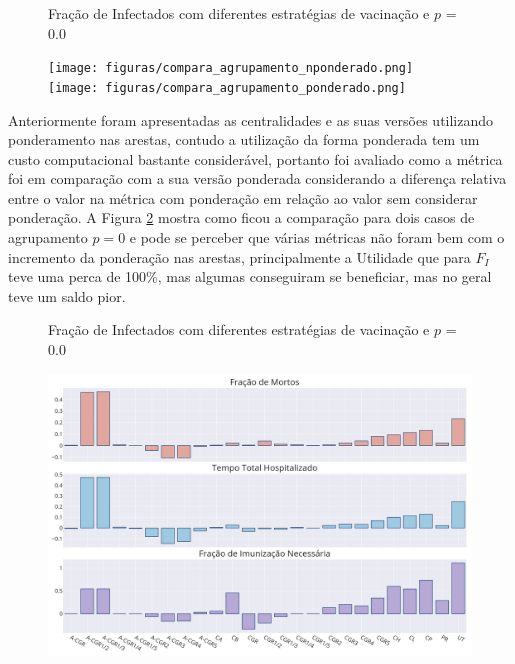 \begin{figure}[H]
    \centering
    \captionsetup{font=normalsize,skip=0.8pt,singlelinecheck=on,labelsep=endash}
    \caption{Fração de Infectados com diferentes estratégias de vacinação e $p$ = 0.0}
    
    \texttt{[image: figuras/compara\_agrupamento\_nponderado.png]}
    \\
    \texttt{[image: figuras/compara\_agrupamento\_ponderado.png]}
    \captionsetup{font=small,justification=justified}
    \caption*{}
    \label{fig:Spearman_p}
\end{figure}

Anteriormente foram apresentadas as centralidades e as suas versões utilizando ponderamento nas arestas, contudo a utilização da forma ponderada tem um custo computacional bastante considerável, portanto foi avaliado como a métrica foi em comparação com a sua versão ponderada considerando a diferença relativa entre o valor na métrica com ponderação em relação ao valor sem considerar ponderação. A Figura \ref{fig:compara_pesos} mostra como ficou a comparação para dois casos de agrupamento $p = 0$ e pode se perceber que várias métricas não foram bem com o incremento da ponderação nas arestas, principalmente a Utilidade que para $F_I$ teve uma perca de 100\%, mas algumas conseguiram se beneficiar, mas no geral teve um saldo pior.

\begin{figure}[H]
    \centering
    \captionsetup{font=normalsize,skip=0.8pt,singlelinecheck=on,labelsep=endash}
    \caption{Fração de Infectados com diferentes estratégias de vacinação e $p$ = 0.0}
    
    \includegraphics[scale= 0.3]{figuras/compara_pesos_0.0.png}
    \\
    \captionsetup{font=small,justification=justified}
    \caption*{}
    \label{fig:compara_pesos}
\end{figure}

